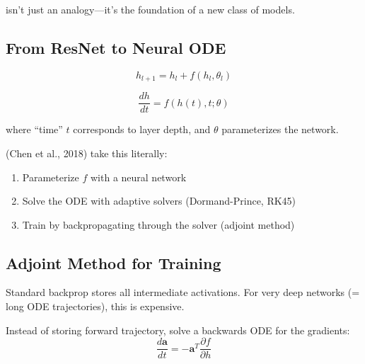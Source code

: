  isn't just an analogy---it's the foundation of a new class of models.


\subsection{From ResNet to Neural ODE}

\begin{equation}
    h_{l+1} = h_l + f(h_l, \theta_l)
\end{equation}

\begin{equation}
    \frac{dh}{dt} = f(h(t), t; \theta)
\end{equation}

where ``time'' $t$ corresponds to layer depth, and $\theta$ parameterizes the network.


 (Chen et al., 2018) take this literally:
\begin{enumerate}
    \item Parameterize $f$ with a neural network
    \item Solve the ODE with adaptive solvers (Dormand-Prince, RK45)
    \item Train by backpropagating through the solver (adjoint method)
\end{enumerate}


\subsection{Adjoint Method for Training}

 Standard backprop stores all intermediate activations. For very deep networks (= long ODE trajectories), this is expensive.

 Instead of storing forward trajectory, solve a backwards ODE for the gradients:
\begin{equation}
    \frac{d\mathbf{a}}{dt} = -\mathbf{a}^T \frac{\partial f}{\partial h}
\end{equation}

